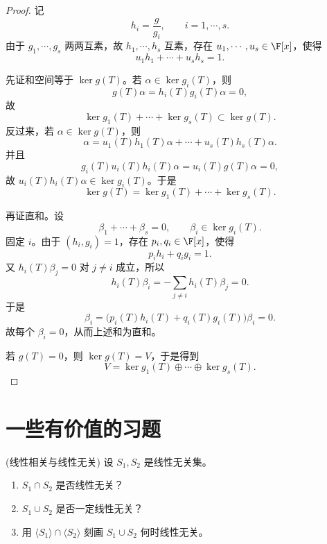 \begin{proof}
	记
	\[
	h_i=\frac{g}{g_i},
	\qquad i=1,\cdots,s.
	\]
	由于 $g_1,\cdots,g_s$ 两两互素，故 $h_1,\cdots,h_s$ 互素，存在 $u_1,\cdots,u_s\in\F[x]$，使得
	\[
	u_1h_1+\cdots+u_sh_s=1.
	\]
	
	先证和空间等于 $\ker g(T)$。若 $\alpha\in\ker g_i(T)$，则
	\[
	g(T)\alpha=h_i(T)g_i(T)\alpha=0,
	\]
	故
	\[
	\ker g_1(T)+\cdots+\ker g_s(T)\subset \ker g(T).
	\]
	反过来，若 $\alpha\in\ker g(T)$，则
	\[
	\alpha=u_1(T)h_1(T)\alpha+\cdots+u_s(T)h_s(T)\alpha.
	\]
	并且
	\[
	g_i(T)u_i(T)h_i(T)\alpha=u_i(T)g(T)\alpha=0,
	\]
	故 $u_i(T)h_i(T)\alpha\in\ker g_i(T)$。于是
	\[
	\ker g(T)=\ker g_1(T)+\cdots+\ker g_s(T).
	\]
	
	再证直和。设
	\[
	\beta_1+\cdots+\beta_s=0,
	\qquad
	\beta_i\in\ker g_i(T).
	\]
	固定 $i$。由于 $(h_i,g_i)=1$，存在 $p_i,q_i\in\F[x]$，使得
	\[
	p_ih_i+q_ig_i=1.
	\]
	又 $h_i(T)\beta_j=0$ 对 $j\neq i$ 成立，所以
	\[
	h_i(T)\beta_i
	=-\sum_{j\neq i}h_i(T)\beta_j=0.
	\]
	于是
	\[
	\beta_i=\bigl(p_i(T)h_i(T)+q_i(T)g_i(T)\bigr)\beta_i=0.
	\]
	故每个 $\beta_i=0$，从而上述和为直和。
	
	若 $g(T)=0$，则 $\ker g(T)=V$，于是得到
	\[
	V=\ker g_1(T)\oplus\cdots\oplus\ker g_s(T).
	\]
\end{proof}
\newpage
\section{一些有价值的习题}

\begin{problem}(线性相关与线性无关)
	设 $S_1,S_2$ 是线性无关集。
	\begin{enumerate}
		\item $S_1\cap S_2$ 是否线性无关？
		\item $S_1\cup S_2$ 是否一定线性无关？
		\item 用 $\langle S_1\rangle\cap\langle S_2\rangle$ 刻画 $S_1\cup S_2$ 何时线性无关。
	\end{enumerate}
\end{problem}

